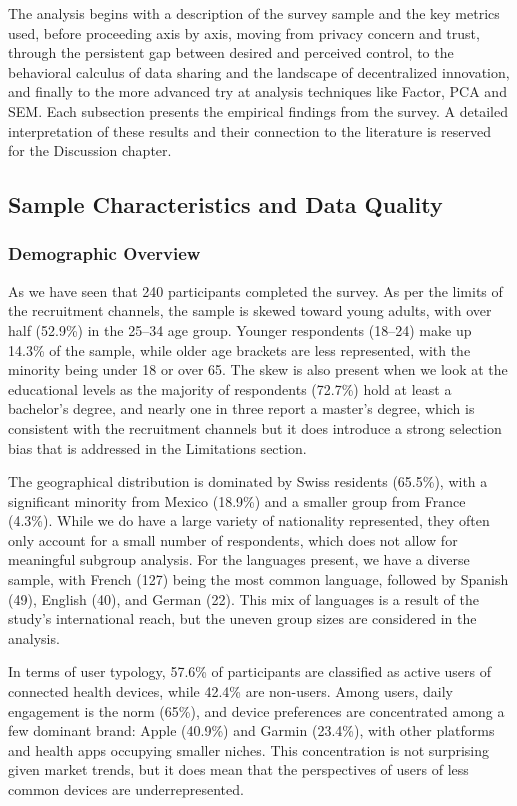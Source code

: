 The analysis begins with a description of the survey sample and the key metrics used, before proceeding axis by axis, moving from privacy concern and trust, through the persistent gap between desired and perceived control, to the behavioral calculus of data sharing and the landscape of decentralized innovation, and finally to the more advanced try at analysis techniques like Factor, PCA and SEM. Each subsection presents the empirical findings from the survey. A detailed interpretation of these results and their connection to the literature is reserved for the Discussion chapter.
\subsection{Sample Characteristics and Data Quality}
	\subsubsection{Demographic Overview}
	As we have seen that 240 participants completed the survey. As per the limits of the recruitment channels, the sample is skewed toward young adults, with over half (52.9\%) in the 25--34 age group. Younger respondents (18--24) make up 14.3\% of the sample, while older age brackets are less represented, with the minority being under 18 or over 65. The skew is also present when we look at the educational levels as the majority of respondents (72.7\%) hold at least a bachelor’s degree, and nearly one in three report a master’s degree, which is consistent with the recruitment channels but it does introduce a strong selection bias that is addressed in the Limitations section.  
	
	The geographical distribution is dominated by Swiss residents (65.5\%), with a significant minority from Mexico (18.9\%) and a smaller group from France (4.3\%). While we do have a large variety of nationality represented, they often only account for a small number of respondents, which does not allow for meaningful subgroup analysis. For the languages present, we have a diverse sample, with French (127) being the most common language, followed by Spanish (49), English (40), and German (22). This mix of languages is a result of the study's international reach, but the uneven group sizes are considered in the analysis.
	
	In terms of user typology, 57.6\% of participants are classified as active users of connected health devices, while 42.4\% are non-users. Among users, daily engagement is the norm (65\%), and device preferences are concentrated among a few dominant brand: Apple (40.9\%) and Garmin (23.4\%), with other platforms and health apps occupying smaller niches. This concentration is not surprising given market trends, but it does mean that the perspectives of users of less common devices are underrepresented.
	
